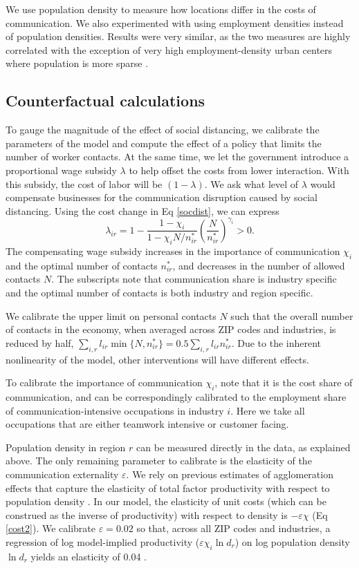 We use population density to measure how locations differ in the costs of communication. We also experimented with using employment densities instead of population densities. Results were very similar, as the two measures are highly correlated with the exception of very high employment-density urban centers where population is more sparse \cite{Heblich2017-lb}.

\subsection*{Counterfactual calculations}
To gauge the magnitude of the effect of social distancing, we calibrate the parameters of the model and compute the effect of a policy that limits the number of worker contacts. At the same time, we let the government introduce a proportional wage subsidy $\lambda$ to help offset the costs from lower interaction. With this subsidy, the cost of labor will be $(1-\lambda)$. We ask what level of $\lambda$ would compensate businesses for the communication disruption caused by social distancing. Using the cost change in Eq \ref{socdist}, we can express
\begin{equation}\label{subsidy}
    \lambda_{ir} = 1 -
        \frac{1-\chi_i}{1-\chi_i N/n_{ir}^*}
        \left(
        \frac{N}{n_{ir}^*}
        \right)^{\gamma_i}>0.
\end{equation}
The compensating wage subsidy increases in the importance of communication $\chi_i$ and the optimal number of contacts $n^*_{ir}$, and decreases in the number of allowed contacts $N$. The subscripts note that communication share is industry specific and the optimal number of contacts is both industry and region specific.

We calibrate the upper limit on personal contacts $N$ such that the overall number of contacts in the economy, when averaged across ZIP codes and industries, is reduced by half, $\sum_{i,r}l_{ir}\min\{N,n_{ir}^*\} = 0.5\sum_{i,r}l_{ir}n_{ir}^*$. Due to the inherent nonlinearity of the model, other interventions will have different effects.

To calibrate the importance of communication $\chi_i$, note that it is the cost share of communication, and can be correspondingly calibrated to the employment share of communication-intensive occupations in industry $i$. Here we take all occupations that are either teamwork intensive or customer facing.

Population density in region $r$ can be measured directly in the data, as explained above.
The only remaining parameter to calibrate is the elasticity of the communication externality $\varepsilon$. We rely on previous estimates of agglomeration effects that capture the elasticity of total factor productivity with respect to population density \cite{Ciccone1996-gu}. In our model, the elasticity of unit costs (which can be construed as the inverse of productivity) with respect to density is $-\varepsilon\chi$ (Eq \eqref{cost2}). We calibrate $\varepsilon=0.02$ so that, across all ZIP codes and industries, a regression of log model-implied productivity ($\varepsilon\chi_i\ln d_r$) on log population density $\ln d_r$ yields an elasticity of 0.04 \cite[page 60]{Ciccone1996-gu}.

